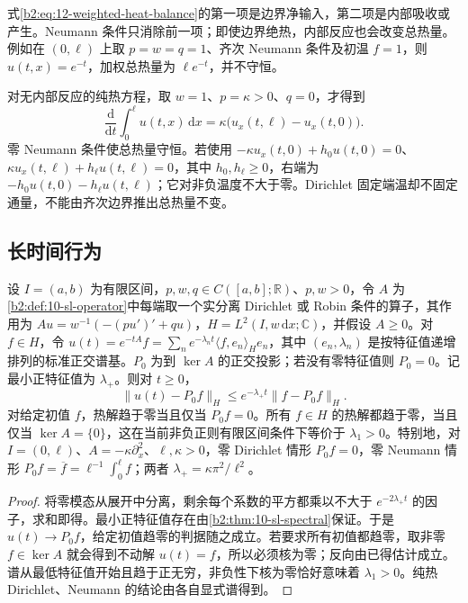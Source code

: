 \ProseParagraphBreak

式\eqref{b2:eq:12-weighted-heat-balance}的第一项是边界净输入，第二项是内部吸收或产生。Neumann 条件只消除前一项；即使边界绝热，内部反应也会改变总热量。例如在 \((0,\ell)\) 上取 \(p=w=q=1\)、齐次 Neumann 条件及初温 \(f=1\)，则 \(u(t,x)=e^{-t}\)，加权总热量为 \(\ell e^{-t}\)，并不守恒。

对无内部反应的纯热方程，取 \(w=1\)、\(p=\kappa>0\)、\(q=0\)，才得到
\[
 \frac{\mathrm{d}}{\mathrm{d}t}\int_0^\ell u(t,x)\,\mathrm{d}x
 =\kappa\bigl(u_x(t,\ell)-u_x(t,0)\bigr).
\]
零 Neumann 条件使总热量守恒。若使用 \(-\kappa u_x(t,0)+h_0u(t,0)=0\)、\(\kappa u_x(t,\ell)+h_\ell u(t,\ell)=0\)，其中 \(h_0,h_\ell\geq0\)，右端为 \(-h_0u(t,0)-h_\ell u(t,\ell)\)；它对非负温度不大于零。Dirichlet 固定端温却不固定通量，不能由齐次边界推出总热量不变。

\subsection{长时间行为}
\label{b2:subsec:120104}

\begin{proposition}[趋向零模态]\label{b2:prop:12-long-time}
设 \(I=(a,b)\) 为有限区间，\(p,w,q\in C([a,b];\mathbb R)\)、\(p,w>0\)，令 \(A\) 为\cref{b2:def:10-sl-operator}中每端取一个实分离 Dirichlet 或 Robin 条件的算子，其作用为 \(Au=w^{-1}(-(pu')'+qu)\)，\(H=L^2(I,w\,\mathrm dx;\mathbb C)\)，并假设 \(A\geq0\)。对 \(f\in H\)，令 \(u(t)=e^{-tA}f=\sum_ne^{-\lambda_nt}\langle f,e_n\rangle_He_n\)，其中 \((e_n,\lambda_n)\) 是按特征值递增排列的标准正交谱基。\(P_0\) 为到 \(\ker A\) 的正交投影；若没有零特征值则 \(P_0=0\)。记最小正特征值为 \(\lambda_+\)。则对 \(t\geq0\)，
\[
 \|u(t)-P_0f\|_H\leq e^{-\lambda_+t}\|f-P_0f\|_H.
\]
对给定初值 \(f\)，热解趋于零当且仅当 \(P_0f=0\)。所有 \(f\in H\) 的热解都趋于零，当且仅当 \(\ker A=\{0\}\)，这在当前非负正则有限区间条件下等价于 \(\lambda_1>0\)。特别地，对 \(I=(0,\ell)\)、\(A=-\kappa\partial_x^2\)、\(\ell,\kappa>0\)，零 Dirichlet 情形 \(P_0f=0\)，零 Neumann 情形 \(P_0f=\overline f=\ell^{-1}\int_0^\ell f\)；两者 \(\lambda_+=\kappa\pi^2/\ell^2\)。
\end{proposition}
\begin{proof}
将零模态从展开中分离，剩余每个系数的平方都乘以不大于 \(e^{-2\lambda_+t}\) 的因子，求和即得。最小正特征值存在由\cref{b2:thm:10-sl-spectral}保证。于是 \(u(t)\to P_0f\)，给定初值趋零的判据随之成立。若要求所有初值都趋零，取非零 \(f\in\ker A\) 就会得到不动解 \(u(t)=f\)，所以必须核为零；反向由已得估计成立。谱从最低特征值开始且趋于正无穷，非负性下核为零恰好意味着 \(\lambda_1>0\)。纯热 Dirichlet、Neumann 的结论由各自显式谱得到。
\end{proof}

